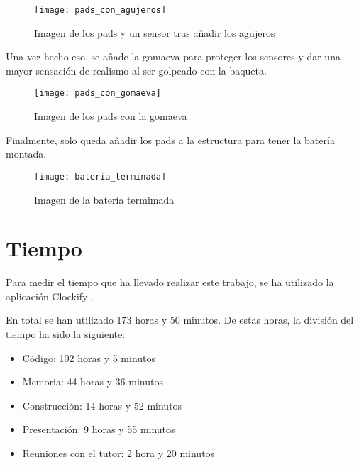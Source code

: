             \begin{figure}[ht]
                \centering
                \texttt{[image: pads\_con\_agujeros]}
                \caption{Imagen de los pads y un sensor tras añadir los agujeros\label{fig:PadsAgujeros}}
            \end{figure}

            \newpage

            Una vez hecho eso, se añade la gomaeva para proteger los sensores y dar una mayor sensación de realismo al
            ser golpeado con la baqueta.

            \begin{figure}[ht]
                \centering
                \texttt{[image: pads\_con\_gomaeva]}
                \caption{Imagen de los pads con la gomaeva\label{fig:PadsGomaeva}}
            \end{figure}

            \newpage

            Finalmente, solo queda añadir los pads a la estructura para tener la batería montada.

            \begin{figure}[ht]
                \centering
                \texttt{[image: bateria\_terminada]}
                \caption{Imagen de la batería termimada\label{fig:BateriaTerminada}}
            \end{figure}



    \section{Tiempo} %
    \label{sec:Tiempo}

        Para medir el tiempo que ha llevado realizar este trabajo, se ha utilizado la aplicación
        Clockify \cite{clockify}.\newline

        En total se han utilizado 173 horas y 50 minutos. De estas horas, la división del tiempo ha sido la siguiente:

        \begin{itemize}
            \item Código: 102 horas y 5 minutos
            \item Memoria: 44 horas y 36 minutos
            \item Construcción: 14 horas y 52 minutos
            \item Presentación: 9 horas y 55 minutos
            \item Reuniones con el tutor: 2 hora y 20 minutos
        \end{itemize}


